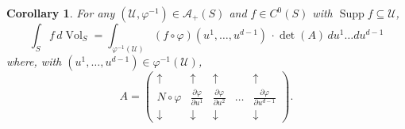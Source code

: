 \documentclass{article}
\newcommand\supp{\operatorname{Supp}}
\renewcommand\det{\operatorname{det}}
\newcommand{\p}{\partial}
\newcommand{\f}[2]{\frac{#1}{#2}}
\theoremstyle{theorem}
\newtheorem{corollary}[theorem]{Corollary}
\newcommand{\Vol}{\operatorname{Vol}}
\begin{document}
\begin{corollary}
For any $(\mathcal{U},\varphi^{-1})\in\mathcal{A}_+(S)$ and $f\in C^0(S)$ with $\supp{f} \subseteq \mathcal{U}$,
\begin{equation*}
    \int_S f\,d\Vol_S = \int_{\varphi^{-1}(\mathcal{U})} (f\circ \varphi)(u^1,\dots,u^{d-1})\, \cdot {\det{(A)}}\,du^1\dots du^{d-1} 
\end{equation*}
where, with $(u^1,\dots, u^{d-1}) \in \varphi^{-1}(\mathcal{U})$, 
\begin{equation*}
    A = 
    \begin{pmatrix}
    \uparrow &\uparrow & \uparrow &   &\uparrow \\ 
    N \circ \varphi &\f{\p \varphi}{\p u^1}& \f{\p \varphi}{\p u^2}  &\dots&\f{\p \varphi}{\p u^{d-1}}\\
    \downarrow  &\downarrow  & \downarrow &    &\downarrow 
    \end{pmatrix}.
\end{equation*}
\end{corollary}
\end{document}
